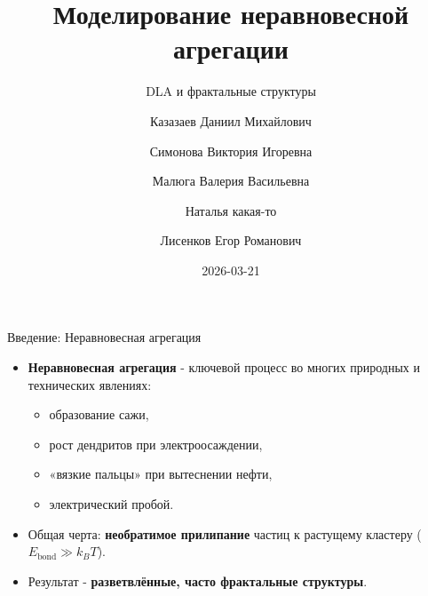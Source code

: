 \documentclass[
  ignorenonframetext,
  aspectratio=169,
  russian,
]{beamer}
\title{Моделирование неравновесной агрегации}
\subtitle{DLA и фрактальные структуры}
\author{Казазаев Даниил Михайлович \and Симонова Виктория
Игоревна \and Малюга Валерия Васильевна \and Наталья
какая-то \and Лисенков Егор Романович}
\date{2026-03-21}
\providecommand{\tightlist}{%
  \setlength{\itemsep}{0pt}\setlength{\parskip}{0pt}}
\begin{document}
\frame{\titlepage}


\begin{frame}{Введение: Неравновесная агрегация}
\label{ux432ux432ux435ux434ux435ux43dux438ux435-ux43dux435ux440ux430ux432ux43dux43eux432ux435ux441ux43dux430ux44f-ux430ux433ux440ux435ux433ux430ux446ux438ux44f}
\begin{itemize}[<+->]
\tightlist
\item
  \textbf{Неравновесная агрегация} - ключевой процесс во многих
  природных и технических явлениях:

  \begin{itemize}[<+->]
  \tightlist
  \item
    образование сажи,
  \item
    рост дендритов при электроосаждении,
  \item
    «вязкие пальцы» при вытеснении нефти,
  \item
    электрический пробой.
  \end{itemize}
\item
  Общая черта: \textbf{необратимое прилипание} частиц к растущему
  кластеру (\(E_{\text{bond}} \gg k_B T\)).
\item
  Результат - \textbf{разветвлённые, часто фрактальные структуры}.
\end{itemize}
\end{frame}
\end{document}
